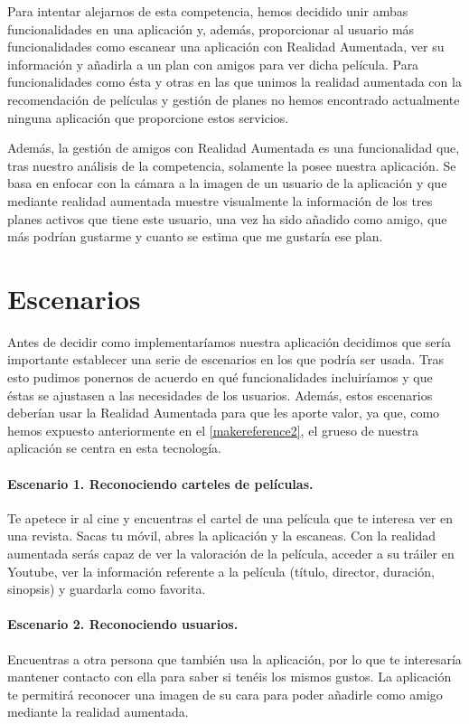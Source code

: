 Para intentar alejarnos de esta competencia, hemos decidido unir ambas funcionalidades en una aplicación y, además, proporcionar al usuario más funcionalidades como escanear una aplicación con Realidad Aumentada, 
 ver su información y añadirla a un plan con amigos para ver dicha película. Para funcionalidades como ésta y otras en las que unimos la realidad aumentada con la recomendación de películas y gestión de planes no hemos encontrado actualmente ninguna aplicación que proporcione estos servicios.

Además, la gestión de amigos con Realidad Aumentada es una funcionalidad que, tras nuestro análisis de la competencia, solamente la posee nuestra aplicación. 
Se basa en enfocar con la cámara a la imagen de un usuario de la aplicación y que mediante realidad aumentada muestre visualmente la información de los tres 
 planes activos que tiene este usuario, una vez ha sido añadido como amigo, que más podrían gustarme y cuanto se estima que me gustaría ese plan.
    
\section{Escenarios}
\label{makereference3.2}
Antes de decidir como implementaríamos nuestra aplicación decidimos que sería importante establecer una serie
de escenarios en los que podría ser usada. Tras esto pudimos ponernos de acuerdo en qué funcionalidades incluiríamos y que 
éstas se ajustasen a las necesidades de los usuarios. Además, estos escenarios deberían usar la Realidad Aumentada para que 
les aporte valor, ya que, como hemos expuesto anteriormente en el \autoref{makereference2}, el grueso de nuestra aplicación se centra en esta tecnología.

\paragraph{Escenario 1. Reconociendo carteles de películas.}
    Te apetece ir al cine y encuentras el cartel de una película que te interesa ver en una revista. Sacas tu móvil, abres la aplicación y 
    la escaneas. Con la realidad aumentada serás capaz de ver la valoración de la película, acceder a su tráiler en Youtube, ver la información
    referente a la película (título, director, duración, sinopsis) y guardarla como favorita.
    
\paragraph{Escenario 2. Reconociendo usuarios.}
    Encuentras a otra persona que también usa la aplicación, por lo que te interesaría mantener contacto con ella para saber si tenéis los mismos 
    gustos. La aplicación te permitirá reconocer una imagen de su cara para poder añadirle como amigo mediante la realidad aumentada. 

